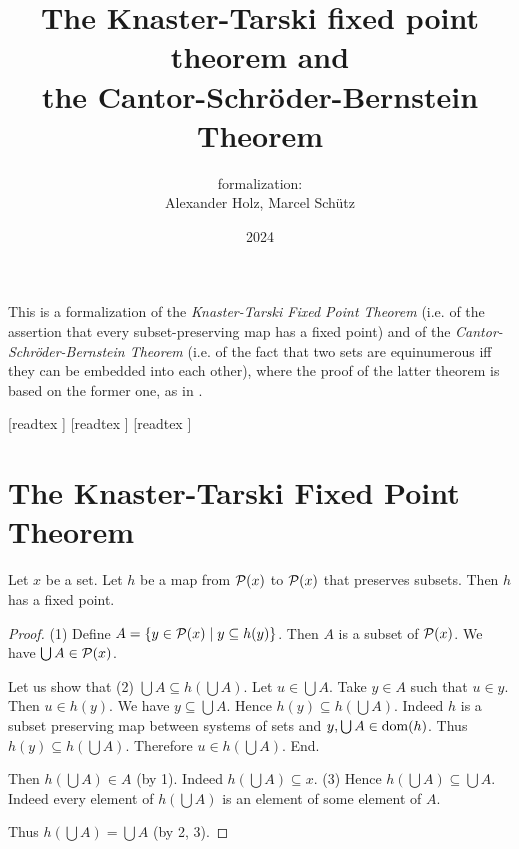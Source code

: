 \documentclass{article}
\title{The Knaster-Tarski fixed point theorem and \\
the Cantor-Schröder-Bernstein Theorem}
\author{\Naproche formalization:\\[0.5em]Alexander Holz, Marcel Schütz}
\date{2024}
\begin{document}
  \maketitle

  \noindent This is a formalization of the \textit{Knaster-Tarski Fixed Point
  Theorem} (i.e. of the assertion that every subset-preserving map has a fixed
  point) and of the \textit{Cantor-Schröder-Bernstein Theorem} (i.e. of the
  fact that two sets are equinumerous iff they can be embedded into each other),
  where the proof of the latter theorem is based on the former one, as in
  \cite{Schroeder2012}.

  \begin{imports}
    \begin{forthel}
      [readtex ]
      [readtex ]
      [readtex ]
    \end{forthel}
  \end{imports}


  \section*{The Knaster-Tarski Fixed Point Theorem}

  \begin{forthel}
    \begin{theorem*}\label{knaster_tarski}
      Let $x$ be a set.
      Let $h$ be a map from $\mathcal{P}(x)$ to $\mathcal{P}(x)$ that preserves subsets.
      Then $h$ has a fixed point.
    \end{theorem*}
    \begin{proof}
      (1) Define $A = \{y \in \mathcal{P}(x) \mid y \subseteq h(y)\}$.
      Then $A$ is a subset of $\mathcal{P}(x)$.
      We have $\bigcup A \in \mathcal{P}(x)$.

      Let us show that (2) $\bigcup A \subseteq h(\bigcup A)$.
        Let $u \in \bigcup A$.
        Take $y \in A$ such that $u \in y$.
        Then $u \in h(y)$.
        We have $y \subseteq \bigcup A$.
        Hence $h(y) \subseteq h(\bigcup A)$.
        Indeed $h$ is a subset preserving map between systems of sets and $y, \bigcup A \in \operatorname{dom}(h)$.
        Thus $h(y) \subseteq h(\bigcup A)$.
        Therefore $u \in h(\bigcup A)$.
      End.

      Then $h(\bigcup A) \in A$ (by 1).
      Indeed $h(\bigcup A) \subseteq x$.
      (3) Hence $h(\bigcup A) \subseteq \bigcup A$.
      Indeed every element of $h(\bigcup A)$ is an element of some element of
      $A$.

      Thus $h(\bigcup A) = \bigcup A$ (by 2, 3).
    \end{proof}
  \end{forthel}
\end{document}
